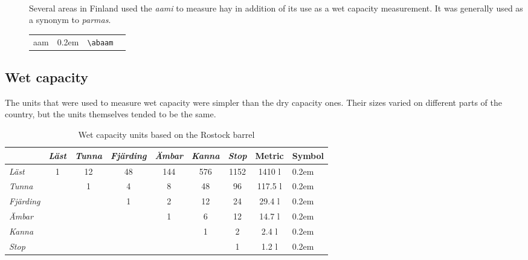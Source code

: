 \documentclass[a4paper]{article}
\newcommand{\samplefont}{\fontsize{16}{16}\abcursivefamily\spaceskip0.2em}
\newcommand{\sample}[1]{{\samplefont #1 \strut}}
\newcommand{\ltxncmd}[1]{\texttt{\textbackslash{}#1}}
\begin{document}
\begin{description}
\item [\sample{\abaam} \emph{åm}, \emph{aami} ] \mbox{} \\
  Several areas in Finland used the \emph{aami} to measure hay in
  addition of its use as a wet capacity measurement. It was generally
  used as a synonym to \emph{parmas}. 
  \begin{center}
    \begin{tabular}{llll}
      {}aam & \sample{\abaam} & \ltxncmd{abaam} \\
    \end{tabular}
  \end{center}



\end{description}



\subsection{Wet capacity}

The units that were used to measure wet capacity were simpler than the
dry capacity ones. Their sizes varied on different parts of the
country, but the units themselves tended to be the same.


\begin{table}
  \centering
  \begin{tabular}{lcccccc|cl}
    & \emph{Läst} & \emph{Tunna} & \emph{Fjärding} & \emph{Ämbar} & \emph{Kanna} &
    \emph{Stop} & Metric & Symbol \\
    \hline
    \emph{Läst}     & 1 & 12 & 48 & 144 & 576 & 1152 & 1410 l & \sample{\ablast} \\
    \emph{Tunna}    &   & 1  &  4 &  8  & 48  & 96   & 117.5 l & \sample{\abtunna}\\
    \emph{Fjärding} &   &    &  1 &  2  & 12  & 24   &  29.4 l & \sample{\abfjarding} \\
    \emph{Ämbar}    &   &    &    &  1  & 6   & 12   &  14.7 l & \sample{\abambar} \\
    \emph{Kanna}    &   &    &    &     & 1   &  2   &  2.4 l & \sample{\abkanna} \\
    \emph{Stop}     &   &    &    &     &     &  1   &  1.2 l & \sample{\abstop} \\
  \end{tabular}
  \caption{Wet capacity units based on the Rostock barrel}
  \label{tab_large_wet_a}
\end{table}
\end{document}
